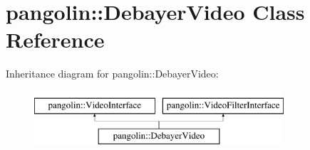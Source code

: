 \hypertarget{classpangolin_1_1_debayer_video}{}\section{pangolin\+:\+:Debayer\+Video Class Reference}
\label{classpangolin_1_1_debayer_video}
Inheritance diagram for pangolin\+:\+:Debayer\+Video\+:\begin{figure}[H]
\begin{center}
\leavevmode
\includegraphics[height=2.000000cm]{classpangolin_1_1_debayer_video}
\end{center}
\end{figure}

